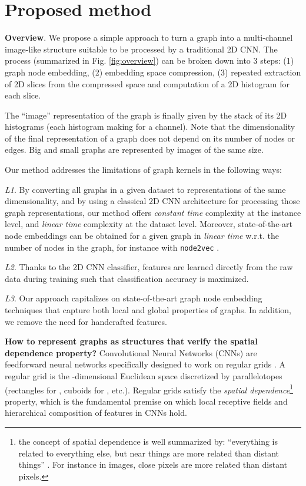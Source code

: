 \documentclass[runningheads]{llncs}
\begin{document}
\vspace{-1cm}

\section{Proposed method}
\noindent \textbf{Overview}.
We propose a simple approach to turn a graph into a multi-channel image-like structure suitable to be processed by a traditional 2D CNN. The process (summarized in Fig. \ref{fig:overview}) can be broken down into 3 steps:
(1) graph node embedding,
(2) embedding space compression,
(3) repeated extraction of 2D slices from the compressed space and computation of a 2D histogram for each slice.

The ``image'' representation of the graph is finally given by the stack of its 2D histograms (each histogram making for a channel). Note that the dimensionality of the final representation of a graph does not depend on its number of nodes or edges. Big and small graphs are represented by images of the same size.

Our method addresses the limitations of graph kernels in the following ways: 

\textit{L1}. By converting all graphs in a given dataset to representations of the same dimensionality, and by using a classical 2D CNN architecture for processing those graph representations, our method offers \textit{constant time} complexity at the instance level, and \textit{linear time} complexity at the dataset level. Moreover, state-of-the-art node embeddings can be obtained for a given graph in \textit{linear time} w.r.t. the number of nodes in the graph, for instance with \texttt{node2vec} \cite{grover2016node2vec}.

\textit{L2}. Thanks to the 2D CNN classifier, features are learned directly from the raw data during training such that classification accuracy is maximized.

\textit{L3}. Our approach capitalizes on state-of-the-art graph node embedding techniques that capture both local and global properties of graphs. In addition, we remove the need for handcrafted features.

\noindent \textbf{How to represent graphs as structures that verify the spatial dependence property?} Convolutional Neural Networks (CNNs) are feedforward neural networks specifically designed to work on regular grids \cite{lecun1998gradient}. A regular grid is the -dimensional Euclidean space discretized by parallelotopes (rectangles for , cuboids for , etc.). Regular grids satisfy the \textit{spatial dependence}\footnote{\scriptsize{the concept of spatial dependence is well summarized by:
``everything is related to everything else, but near things are more related than distant things'' \cite{tobler1970computer}. For instance in images, close pixels are more related than distant pixels.}} property, which is the fundamental premise on which local receptive fields and hierarchical composition of features in CNNs hold.
\end{document}
